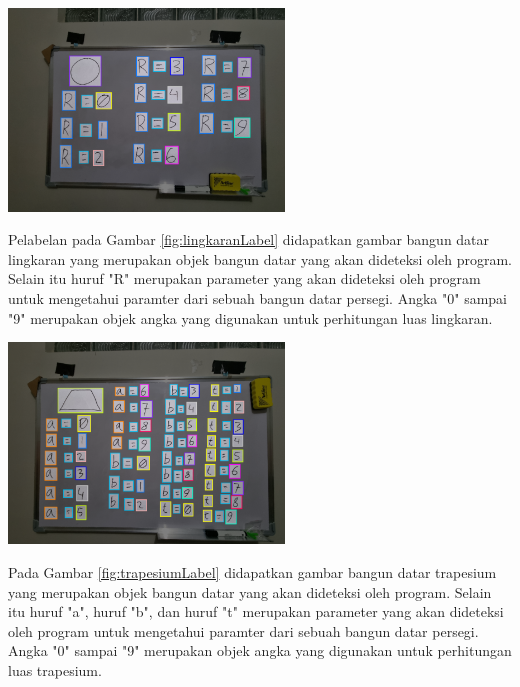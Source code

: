 \begin{center}
	\includegraphics[width=0.55\textwidth]{gambar/Lingkaran Label.png}	
	\label{fig:lingkaranLabel}
\end{center}
Pelabelan pada Gambar \ref{fig:lingkaranLabel} didapatkan gambar bangun datar lingkaran yang merupakan objek bangun datar yang akan dideteksi oleh program. Selain itu huruf "R" merupakan parameter yang akan dideteksi oleh program untuk mengetahui paramter dari sebuah bangun datar persegi. Angka "0" sampai "9" merupakan objek angka yang digunakan untuk perhitungan luas lingkaran.

\begin{center}
	\includegraphics[width=0.55\textwidth]{gambar/Trapesium Label.png}
	\label{fig:trapesiumLabel}
\end{center}
Pada Gambar \ref{fig:trapesiumLabel} didapatkan gambar bangun datar trapesium yang merupakan objek bangun datar yang akan dideteksi oleh program. Selain itu huruf "a", huruf "b", dan huruf "t" merupakan parameter yang akan dideteksi oleh program untuk mengetahui paramter dari sebuah bangun datar persegi. Angka "0" sampai "9" merupakan objek angka yang digunakan untuk perhitungan luas trapesium.

